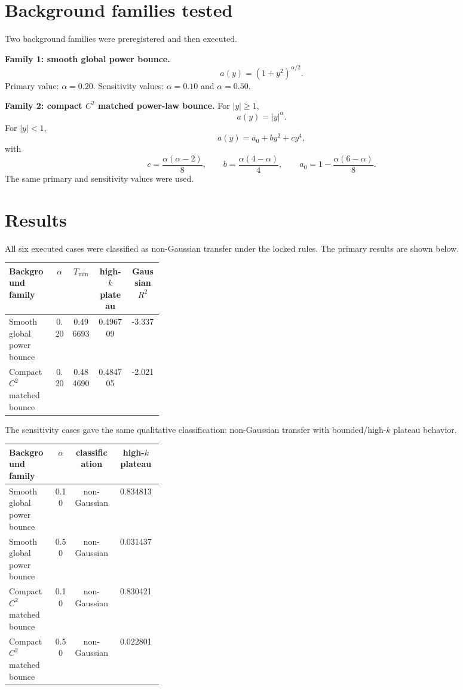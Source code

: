 \documentclass[11pt,a4paper]{article}
\begin{document}
\section{Background families tested}
Two background families were preregistered and then executed.

\textbf{Family 1: smooth global power bounce.}
\[
 a(y)=(1+y^2)^{\alpha/2}.
\]
Primary value: $\alpha=0.20$. Sensitivity values: $\alpha=0.10$ and $\alpha=0.50$.

\textbf{Family 2: compact $C^2$ matched power-law bounce.}
For $|y|\geq 1$,
\[
 a(y)=|y|^\alpha.
\]
For $|y|<1$,
\[
 a(y)=a_0+b y^2+c y^4,
\]
with
\[
 c=\frac{\alpha(\alpha-2)}{8},\qquad
 b=\frac{\alpha(4-\alpha)}{4},\qquad
 a_0=1-\frac{\alpha(6-\alpha)}{8}.
\]
The same primary and sensitivity values were used.

\section{Results}
All six executed cases were classified as non-Gaussian transfer under the locked rules. The primary results are shown below.

\begin{center}
\begin{tabular}{p{0.30\linewidth}cccc}
\toprule
Background family & $\alpha$ & $T_{\min}$ & high-$k$ plateau & Gaussian $R^2$ \\
\midrule
Smooth global power bounce & 0.20 & 0.496693 & 0.496709 & -3.337 \\
Compact $C^2$ matched bounce & 0.20 & 0.484690 & 0.484705 & -2.021 \\
\bottomrule
\end{tabular}
\end{center}

The sensitivity cases gave the same qualitative classification: non-Gaussian transfer with bounded/high-$k$ plateau behavior.

\begin{center}
\begin{tabular}{p{0.30\linewidth}ccc}
\toprule
Background family & $\alpha$ & classification & high-$k$ plateau \\
\midrule
Smooth global power bounce & 0.10 & non-Gaussian & 0.834813 \\
Smooth global power bounce & 0.50 & non-Gaussian & 0.031437 \\
Compact $C^2$ matched bounce & 0.10 & non-Gaussian & 0.830421 \\
Compact $C^2$ matched bounce & 0.50 & non-Gaussian & 0.022801 \\
\bottomrule
\end{tabular}
\end{center}
\end{document}
